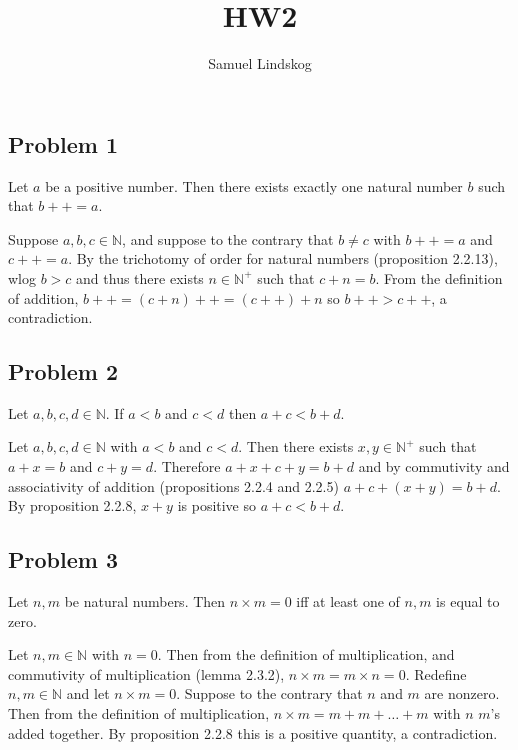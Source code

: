 \documentclass{article}
\begin{document}
\theoremstyle{definition}\newtheorem{definition}{Definition}[section]
\theoremstyle{definition}\newtheorem{theorem}{Theorem}[section]
\theoremstyle{definition}\newtheorem{corrolary}{Corollary}
\theoremstyle{definition}\newtheorem{lemma}{Lemma}[section]
\theoremstyle{definition}\newtheorem{problem}{Problem}
\theoremstyle{remark}\newtheorem*{notation}{Notation}

\title{HW2}
\author{Samuel Lindskog}
\maketitle
\subsection*{Problem 1}
Let \(a\) be a positive number. Then there exists exactly one natural number \(b\) such that \(b++=a\).
\medbreak
\begin{IEEEproof}
	Suppose \(a,b,c\in\mathbb{N}\), and suppose to the contrary that \(b\neq c\) with \(b++=a\) and \(c++=a\). By the trichotomy of order for natural numbers (proposition 2.2.13), wlog \(b>c\) and thus there exists \(n\in\mathbb{N}^+\) such that \(c+n=b\). From the definition of addition, \(b++=(c+n)++=(c++)+n\) so \(b++>c++\), a contradiction.
\end{IEEEproof}
\subsection*{Problem 2}
Let \(a,b,c,d\in\mathbb{N}\). If \(a<b\) and \(c<d\) then \(a+c<b+d\).
\begin{IEEEproof}
	Let \(a,b,c,d\in\mathbb{N}\) with \(a<b\) and \(c<d\). Then there exists \(x,y\in\mathbb{N}^+\) such that \(a+x=b\) and \(c+y=d\). Therefore \(a+x+c+y=b+d\) and by commutivity and associativity of addition (propositions 2.2.4 and 2.2.5) \(a+c+(x+y)=b+d\). By proposition 2.2.8, \(x+y\) is positive so \(a+c<b+d\).
\end{IEEEproof}
\subsection*{Problem 3}
Let \(n,m\) be natural numbers. Then \(n\times m=0\) iff at least one of \(n,m\) is equal to zero.
\begin{IEEEproof}
	Let \(n,m\in\mathbb{N}\) with \(n=0\). Then from the definition of multiplication, and commutivity of multiplication (lemma 2.3.2), \(n\times m=m\times n=0\). Redefine \(n,m\in\mathbb{N}\) and let \(n\times m=0\). Suppose to the contrary that \(n\) and \(m\) are nonzero. Then from the definition of multiplication, \(n\times m=m+m+\ldots+m\) with \(n\) \(m\)'s added together. By proposition 2.2.8 this is a positive quantity, a contradiction.
\end{IEEEproof}
\end{document}

